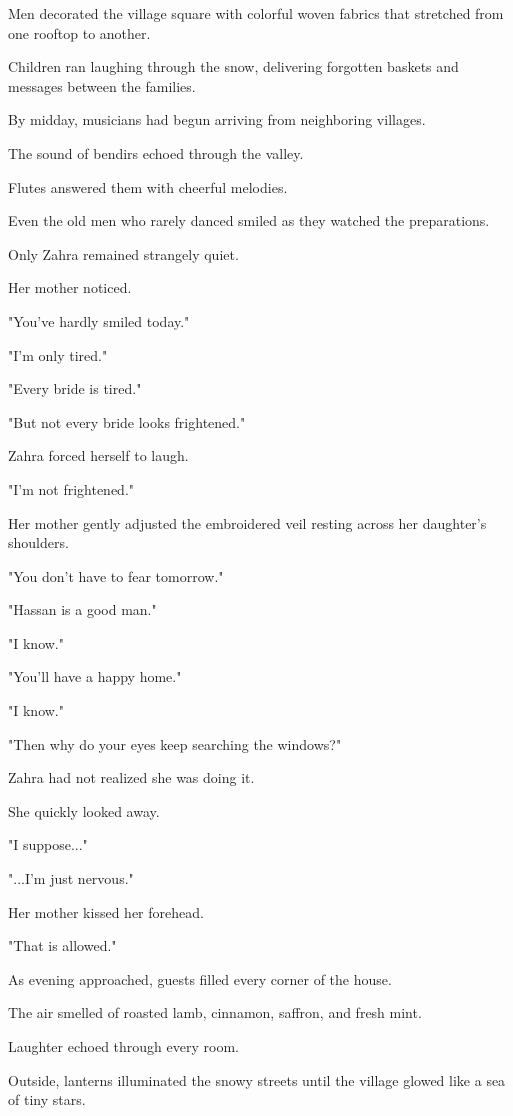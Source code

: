 \documentclass[12pt,openany]{book}
\begin{document}
Men decorated the village square with colorful woven fabrics that stretched from one rooftop to another.

Children ran laughing through the snow, delivering forgotten baskets and messages between the families.

By midday, musicians had begun arriving from neighboring villages.

The sound of bendirs echoed through the valley.

Flutes answered them with cheerful melodies.

Even the old men who rarely danced smiled as they watched the preparations.

Only Zahra remained strangely quiet.

Her mother noticed.

"You've hardly smiled today."

"I'm only tired."

"Every bride is tired."

"But not every bride looks frightened."

Zahra forced herself to laugh.

"I'm not frightened."

Her mother gently adjusted the embroidered veil resting across her daughter's shoulders.

"You don't have to fear tomorrow."

"Hassan is a good man."

"I know."

"You'll have a happy home."

"I know."

"Then why do your eyes keep searching the windows?"

Zahra had not realized she was doing it.

She quickly looked away.

"I suppose..."

"...I'm just nervous."

Her mother kissed her forehead.

"That is allowed."

As evening approached, guests filled every corner of the house.

The air smelled of roasted lamb, cinnamon, saffron, and fresh mint.

Laughter echoed through every room.

Outside, lanterns illuminated the snowy streets until the village glowed like a sea of tiny stars.
\end{document}
